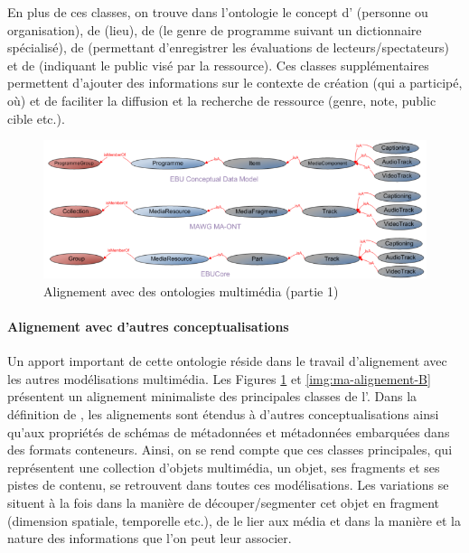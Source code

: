En plus de ces classes, on trouve dans l'ontologie le concept d' (personne ou organisation), de  (lieu), de  (le genre de programme suivant un dictionnaire spécialisé), de  (permettant d'enregistrer les évaluations de lecteurs/spectateurs) et de  (indiquant le public visé par la ressource).
Ces classes supplémentaires permettent d'ajouter des informations sur le contexte de création (qui a participé, où) et de faciliter la diffusion et la recherche de ressource (genre, note, public cible etc.).

\begin{figure}[ht!]
\centering
\includegraphics[width=\textwidth]{images/MA-alignement-A.png}
\caption{Alignement avec des ontologies multimédia (partie 1)}
\label{img:ma-alignement-A}
\end{figure}

\paragraph{Alignement avec d'autres conceptualisations}
Un apport important de cette ontologie réside dans le travail d'alignement avec les autres modélisations multimédia. 
Les Figures \ref{img:ma-alignement-A} et \ref{img:ma-alignement-B} présentent un alignement minimaliste des principales classes de l'.
Dans la définition de \cite{Lee2012}, les alignements sont étendus à d'autres conceptualisations ainsi qu'aux propriétés de schémas de métadonnées et métadonnées embarquées dans des formats conteneurs.
Ainsi, on se rend compte que ces classes principales, qui représentent une collection d'objets multimédia, un objet, ses fragments et ses pistes de contenu, se retrouvent dans toutes ces modélisations. 
Les variations se situent à la fois dans la manière de découper/segmenter cet objet en fragment (dimension spatiale, temporelle etc.), de le lier aux média et dans la manière et la nature des informations que l'on peut leur associer.

